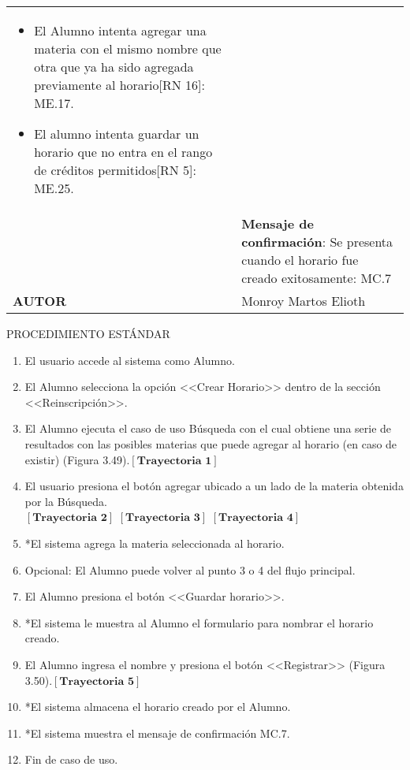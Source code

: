 \begin{longtable}{ | p{6cm} | p{10cm} |}
\begin{itemize}
		\item El Alumno intenta agregar una materia con el mismo nombre que otra que ya ha sido agregada previamente al horario[RN 16]: ME.17.
		\item El alumno intenta guardar un horario que no entra en el rango de créditos permitidos[RN 5]: ME.25.
	\end{itemize}\\&\textbf{Mensaje de confirmación}: Se presenta cuando el horario fue creado exitosamente: MC.7\\
	\hline
	\textbf{AUTOR} & Monroy Martos Elioth\\
	\hline
\end{longtable}
\vspace*{1cm}
\noindent
\Large{PROCEDIMIENTO ESTÁNDAR}
\large{}
\begin{enumerate}
	\item El usuario accede al sistema como Alumno.
	\item El Alumno selecciona la opción <<Crear Horario>> dentro de la sección <<Reinscripción>>.
	\item El Alumno ejecuta el caso de uso Búsqueda con el cual obtiene una serie de resultados con las posibles materias que puede agregar al horario (en caso de existir) (Figura 3.49).$\left[\textbf{Trayectoria 1}\right]$
	\item El usuario presiona el botón agregar ubicado a un lado de la materia obtenida por la Búsqueda.\\$\left[\textbf{Trayectoria 2}\right]$
	$\left[\textbf{Trayectoria 3}\right]$
	$\left[\textbf{Trayectoria 4}\right]$
	\item *El sistema agrega la materia seleccionada al horario.
	\item Opcional: El Alumno puede volver al punto 3 o 4 del flujo principal.
	\item El Alumno presiona el botón <<Guardar horario>>.
	\item *El sistema le muestra al Alumno el formulario para nombrar el horario creado.
	\item El Alumno ingresa el nombre y presiona el botón <<Registrar>> (Figura 3.50).$\left[\textbf{Trayectoria 5}\right]$
	\item *El sistema almacena el horario creado por el Alumno.
	\item *El sistema muestra el mensaje de confirmación MC.7.
	\item Fin de caso de uso.
\end{enumerate}
\vspace*{1cm}
